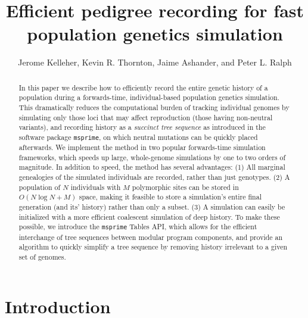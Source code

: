 \documentclass{article}
\newcommand{\msprime}{\texttt{msprime}}
\begin{document}
\title{Efficient pedigree recording for fast population genetics simulation}
\author{Jerome Kelleher,
        Kevin R. Thornton,
        Jaime Ashander, and
        Peter L. Ralph}
\maketitle



\begin{abstract}
    In this paper we describe how to
    efficiently record the entire genetic history of a population
    during a forwards-time, individual-based population genetics simulation.
    This dramatically reduces the computational burden of tracking individual genomes
    by simulating only those loci that may affect reproduction (those having non-neutral variants),
    and recording history as a \emph{succinct tree sequence} as introduced in the software package \msprime,
    on which neutral mutations can be quickly placed afterwards.
    We implement the method in two popular forwards-time simulation frameworks,
    which speeds up large, whole-genome simulations by one to two orders of magnitude.
    In addition to speed, the method has several advantages:
    (1) All marginal genealogies of the simulated individuals are recorded, rather than just genotypes.
    (2) A population of $N$ individuals with $M$ polymorphic sites
    can be stored in $O(N \log N + M)$ space, making it feasible to store a simulation's entire final generation (and its' history)
    rather than only a subset.
    (3) A simulation can easily be initialized with a more efficient coalescent simulation of deep history.
    To make these possible,
    we introduce the \msprime{} Tables API, which allows for the efficient interchange
    of tree sequences between modular program components,
    and provide an algorithm to quickly simplify a tree sequence by removing history irrelevant to a given set of genomes.
\end{abstract}



\section*{Introduction}
\end{document}
